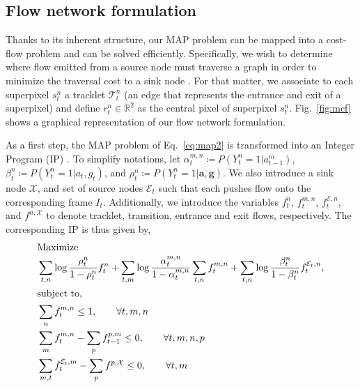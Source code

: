 \subsection{Flow network formulation}
\label{sec:solving}
Thanks to its inherent structure, our MAP problem can be mapped into a cost-flow problem and can be solved efficiently. Specifically, we wish to determine where flow emitted from a source node must traverse a graph in order to minimize the traversal cost to a sink node \cite{zhang08}. For that matter, we associate to each superpixel $s_t^n$ a tracklet $\mathcal{T}_t^n$ (\ie an edge that represents the entrance and exit of a superpixel) and define $r_t^n\in \mathbb{R}^2$ as the central pixel of superpixel $s_t^n$. Fig.~\ref{fig:mcf} shows a graphical representation of our flow network formulation.

As a first step, the MAP problem of Eq.~\eqref{eq:map2} is transformed into an Integer Program (IP) \cite{schrijver98}. To simplify notations, let $\alpha_t^{m,n} \coloneqq P(Y_t^n=1|a_{t-1}^m)$, $\beta_t^n \coloneqq P(Y_t^n=1|a_t,g_t)$, and $\rho_t^n \coloneqq P(Y_t^n=1|\bm{a},\bm{g})$. We also introduce a sink node $\mathcal{X}$, and set of source nodes $\mathcal{E}_t$ such that each pushes flow onto the corresponding frame $I_t$.
Additionally, we introduce the variables $f_t^n$, $f_t^{m,n}$, $f_t^{\mathcal{E},n}$, and $f^{n,\mathcal{X}}$ to denote tracklet, transition, entrance and exit flows, respectively. The corresponding IP is thus given by,
  \begin{subequations}
  \label{eq:int_prog}
  \begin{align}
  \intertext{Maximize}
  &\sum_{t,n} \log{\frac{\rho_t^n}{1-\rho_t^n}}f_t^n + \sum_{t,m} \log{\frac{\alpha_t^{m,n}}{1-\alpha_t^{m,n}}}\sum_{t,n}f_t^{m,n} + \sum_{t,n} \log{\frac{\beta_t^n}{1-\beta_t^n}}f_t^{\mathcal{E}_t,n},\label{eq:loglikelihood}\\
  \intertext{subject to,}
  &\sum\limits_{n}f_t^{m,n} \leq 1, \qquad \forall t,m,n \label{eq:cap1_trans}\\
  &\sum_m f_t^{m,n} - \sum_p f_{t-1}^{p,m} \leq 0, \qquad \forall t,m,n,p \label{eq:conserv1}\\
  &\sum_{m,t} f_t^{\mathcal{E}_t,m} - \sum_p f^{p,\mathcal{X}} \leq 0, \qquad \forall t,m\label{eq:conserv2}
  \end{align}
  \end{subequations}
